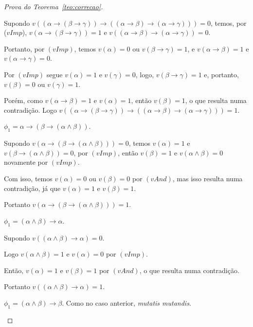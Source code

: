 \begin{proof}[Prova do Teorema~\ref{teo:correcao}]
\begin{provaporcasos}
\begin{provaporsubcasos}
                    Supondo $v((\alpha \to (\beta \to \gamma)) \to ((\alpha \to \beta) \to (\alpha \to \gamma))) = 0$, temos, por ($vImp$), $v(\alpha \to (\beta \to \gamma)) = 1 \text{ e } v((\alpha \to \beta) \to (\alpha \to \gamma)) = 0$.

                    Portanto, por $(vImp)$, temos $v(\alpha) = 0$ ou $v(\beta \to \gamma) = 1$, e $v(\alpha \to \beta) = 1$ e $v(\alpha \to \gamma) = 0$. 
                    
                    Por $(vImp)$ segue $v(\alpha) = 1$ e $v(\gamma) = 0$, logo, $v(\beta \to \gamma) = 1$ e, portanto, $v(\beta) = 0$ ou $v(\gamma) = 1$. 
                    
                    Porém, como $v(\alpha \to \beta) = 1$ e $v(\alpha) = 1$, então $v(\beta) = 1$, o que resulta numa contradição. Logo $v((\alpha \to (\beta \to \gamma)) \to ((\alpha \to \beta) \to (\alpha \to \gamma))) = 1$.

                \subcasodeprova{} $\phi_{1} = \alpha \to (\beta \to (\alpha \land \beta))$. 

                    Supondo $v(\alpha \to (\beta \to (\alpha \land \beta))) = 0$, temos $v(\alpha) = 1$ e $v(\beta \to (\alpha \land \beta)) = 0$, por $(vImp)$, então $v(\beta) = 1$ e $v(\alpha \land \beta) = 0$ novamente por $(vImp)$. 
                    
                    Com isso, temos $v(\alpha) = 0$ ou $v(\beta) = 0$ por $(vAnd)$, mas isso resulta numa contradição, já que $v(\alpha) = 1$ e $v(\beta) = 1$. 
                    
                    Portanto $v(\alpha \to (\beta \to (\alpha \land \beta))) = 1$.

                \subcasodeprova{} $\phi_{1} = (\alpha \land \beta) \to \alpha$. 
                
                    Supondo $v((\alpha \land \beta) \to \alpha) = 0$. 
                
                    Logo $v(\alpha \land \beta) = 1$ e $v(\alpha) = 0$ por $(vImp)$. 
                    
                    Então, $v(\alpha) = 1$ e $v(\beta) = 1$ por $(vAnd)$, o que resulta numa contradição. 
                    
                    Portanto $v((\alpha \land \beta) \to \alpha) = 1$.

                \subcasodeprova{} $\phi_{1} = (\alpha \land \beta) \to \beta$. Como no caso anterior, \textit{mutatis mutandis}.


\end{provaporsubcasos}
\end{provaporcasos}
\end{proof}
